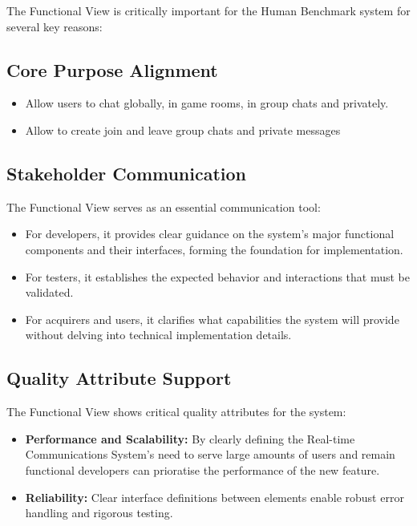 The Functional View is critically important for the Human Benchmark system for several key reasons:

\subsection{Core Purpose Alignment}


\begin{itemize}
    \item Allow users to chat globally, in game rooms, in group chats and privately.
    \item Allow to create join and leave group chats and private messages
\end{itemize}

\subsection{Stakeholder Communication}

The Functional View serves as an essential communication tool:

\begin{itemize}
    \item For developers, it provides clear guidance on the system's major functional components and their interfaces, forming the foundation for implementation.
    \item For testers, it establishes the expected behavior and interactions that must be validated.
    \item For acquirers and users, it clarifies what capabilities the system will provide without delving into technical implementation details.
\end{itemize}

\subsection{Quality Attribute Support}

The Functional View shows critical quality attributes for the system:

\begin{itemize}
    \item \textbf{Performance and Scalability:} By clearly defining the Real-time Communications System's need to serve large amounts of users and remain functional developers can prioratise the performance of the new feature.

    \item \textbf{Reliability:} Clear interface definitions between elements enable robust error handling and rigorous testing.


\end{itemize}

